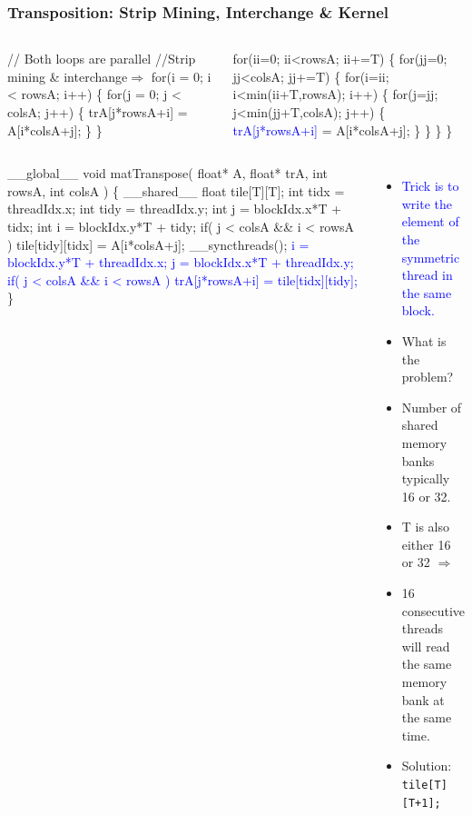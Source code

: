 \documentclass{beamer}
\newcommand{\blue}[1]{\textcolor{Blue}{{#1}}}
\renewcommand{\emph}[1]{\textcolor{structure}{#1}}
\newcommand{\emp}[1]{\textcolor{DikuRed}{ #1}}
\newcommand{\emphh}[1]{\textcolor{CosGreen}{ #1}}
\newcommand{\mymath}[1]{$ #1 $}
\begin{document}
\begin{frame}[fragile,t]
  \frametitle{Transposition: Strip Mining, Interchange \& Kernel} 
\vspace{-1ex}
\begin{columns}
\begin{colorcode}[fontsize=\scriptsize]
//\emphh{Both loops are parallel}
//Strip mining \& interchange\mymath{\Rightarrow}
for(i = 0; i < rowsA; i++) \{    
  for(j = 0; j < colsA; j++) \{ 
    trA[j*rowsA+i] = A[i*colsA+j];
\} \}
\end{colorcode}
\begin{colorcode}[fontsize=\scriptsize]
\emp{for(ii=0; ii<rowsA; ii+=T) \{}
  \emp{for(jj=0; jj<colsA; jj+=T) \{}
    \emphh{for(i=ii; i<min(ii+T,rowsA); i++) \{}
      \emphh{for(j=jj; j<min(jj+T,colsA); j++) \{}
        \blue{trA[j*rowsA+i]} = A[i*colsA+j];
\} \} \} \}
\end{colorcode}
\end{columns}



\begin{columns}
\begin{colorcode}[fontsize=\scriptsize]
__global__ void matTranspose(
        float* A,  float* trA, 
        int rowsA, int colsA  ) \{
  __shared__ float tile[T][\alert{T}];
  int tidx = threadIdx.x;
  int tidy = threadIdx.y;
  int j    = blockIdx.x*T + tidx;
  int i    = blockIdx.y*T + tidy;
  if( j < colsA && i < rowsA )
    tile[tidy][tidx] = A[i*colsA+j];
  __syncthreads();
  \blue{i = blockIdx.y*T + threadIdx.x;} 
  \blue{j = blockIdx.x*T + threadIdx.y;}
  \blue{if( j < colsA && i < rowsA )}
    \blue{trA[j*rowsA+i] = tile[tidx]\alert{[tidy]};}
\}
\end{colorcode}
\begin{itemize}
    \item \blue{Trick is to write the element of the symmetric thread in the same block.}
    \item \alert{What is the problem?}\pause
    \item Number of shared memory banks typically 16 or 32.
    \item T is also either 16 or 32 $\Rightarrow$
    \item 16 consecutive threads will read the same 
            memory bank at the same time.
    \item \emph{Solution: {\tt tile[T][\alert{T+1}];} }
\end  {itemize}
\end{columns}

\end{frame}
\end{document}
